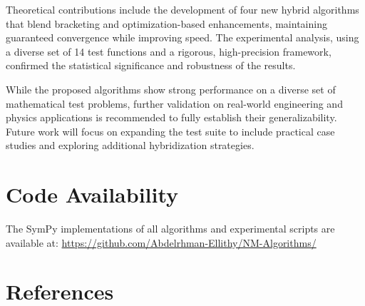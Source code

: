 \documentclass[amsmath, amssymb, aps]{revtex4-2}
\begin{document}
Theoretical contributions include the development of four new hybrid algorithms that blend bracketing and optimization-based enhancements, maintaining guaranteed convergence while improving speed. The experimental analysis, using a diverse set of 14 test functions and a rigorous, high-precision framework, confirmed the statistical significance and robustness of the results.

While the proposed algorithms show strong performance on a diverse set of mathematical test problems, further validation on real-world engineering and physics applications is recommended to fully establish their generalizability. Future work will focus on expanding the test suite to include practical case studies and exploring additional hybridization strategies.

\section*{Code Availability}
The SymPy implementations of all algorithms and experimental scripts are available at: \url{https://github.com/Abdelrhman-Ellithy/NM-Algorithms/}

\section*{References}
\end{document}
